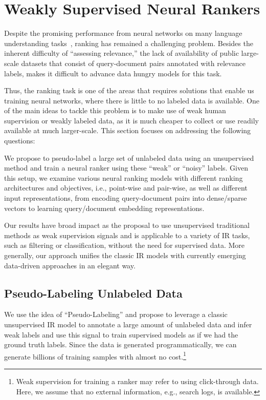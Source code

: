 \section{Weakly Supervised Neural Rankers}
\label{sec:weakly_supervised_neural_rankers}
Despite the promising performance from neural networks on many language understanding tasks~\citep{britz2017massive, hermann2015teaching}, ranking has remained a challenging problem. Besides the inherent difficulty of ``assessing relevance,'' the lack of availability of public large-scale datasets that consist of query-document pairs annotated with relevance labels, makes it difficult to advance data hungry models for this task.

Thus, the ranking task is one of the areas that requires solutions that enable us training neural networks, where there is little to no labeled data is available. 
One of the main ideas to tackle this problem is to make use of weak human supervision or weakly labeled data, as it is much cheaper to collect or use readily available at much larger-scale. This section focuses on addressing the following questions:

We propose to pseudo-label a large set of unlabeled data using an unsupervised method and train a neural ranker using these ``weak'' or ``noisy'' labels. Given this setup, we examine various neural ranking models with different ranking architectures and objectives, i.e., point-wise and pair-wise, as well as different input representations, from encoding query-document pairs into dense\:/\:sparse vectors to learning query\:/\:document embedding representations. 

Our results have broad impact as the proposal to use unsupervised traditional methods as weak supervision signals and is applicable to a variety of IR tasks, such as filtering or classification, without the need for supervised data.  More generally, our approach unifies the classic IR models with currently emerging data-driven approaches in an elegant way.

\subsection{Pseudo-Labeling Unlabeled Data}
\label{sec:pseudo_labeling}
We use the idea of ``Pseudo-Labeling'' and propose to leverage a classic unsupervised IR model to annotate a large amount of unlabeled data and infer weak labels and use this signal to train supervised models as if we had the ground truth labels.
Since the data is generated programmatically, we can generate billions of training samples with almost no cost.\footnote{Weak supervision for training a ranker may refer to using click-through data. Here, we assume that no external information, e.g., search logs, is available.}


